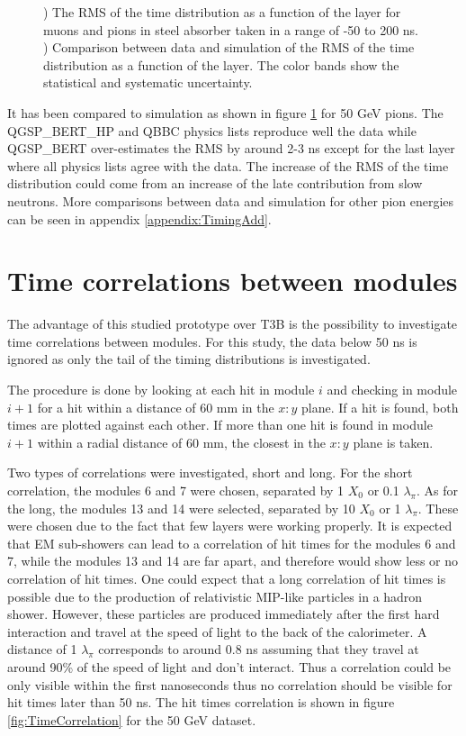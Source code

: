 \begin{figure}[htbp!]
\begin{subfigure}[t]{0.49\textwidth}
		\caption{}\label{fig:Depth_RMS_SimData_50GeV}
	\end{subfigure}
	\caption{) The RMS of the time distribution as a function of the layer for muons and pions in steel absorber taken in a range of -50 to 200 ns. ) Comparison between data and simulation of the RMS of the time distribution as a function of the layer. The color bands show the statistical and systematic uncertainty.}
	\label{fig:DepthRMSProfile}
\end{figure}

It has been compared to simulation as shown in figure \ref{fig:Depth_RMS_SimData_50GeV} for 50 GeV pions. The QGSP\_BERT\_HP and QBBC physics lists reproduce well the data while QGSP\_BERT over-estimates the RMS by around 2-3 ns except for the last layer where all physics lists agree with the data. The increase of the RMS of the time distribution could come from an increase of the late contribution from slow neutrons. More comparisons between data and simulation for other pion energies can be seen in appendix \ref{appendix:TimingAdd}.

\section{Time correlations between modules}

The advantage of this studied prototype over T3B is the possibility to investigate time correlations between modules. For this study, the data below 50 ns is ignored as only the tail of the timing distributions is investigated.

The procedure is done by looking at each hit in module $i$ and checking in module $i+1$ for a hit within a distance of 60 mm in the $x:y$ plane. If a hit is found, both times are plotted against each other. If more than one hit is found in module $i+1$ within a radial distance of 60 mm, the closest in the $x:y$ plane is taken.

Two types of correlations were investigated, short and long. For the short correlation, the modules 6 and 7 were chosen, separated by 1 $X_0$ or 0.1 $\lambda_{\pi}$. As for the long, the modules 13 and 14 were selected, separated by 10 $X_0$ or 1 $\lambda_{\pi}$. These were chosen due to the fact that few layers were working properly. It is expected that EM sub-showers can lead to a correlation of hit times for the modules 6 and 7, while the modules 13 and 14 are far apart, and therefore would show less or no correlation of hit times. One could expect that a long correlation of hit times is possible due to the production of relativistic MIP-like particles in a hadron shower. However, these particles are produced immediately after the first hard interaction and travel at the speed of light to the back of the calorimeter. A distance of 1 $\lambda_{\pi}$ corresponds to around 0.8 ns assuming that they travel at around 90\% of the speed of light and don't interact. Thus a correlation could be only visible within the first nanoseconds thus no correlation should be visible for hit times later than 50 ns. The hit times correlation is shown in figure \ref{fig:TimeCorrelation} for the 50 GeV dataset.

